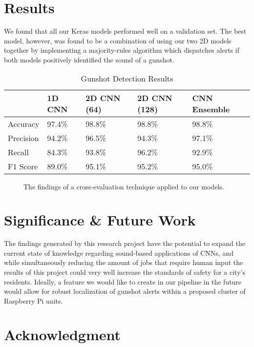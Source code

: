 \documentclass[conference]{IEEEtran}
\begin{document}
\section{Results}

We found that all our Keras models performed well on a validation set. The best model, however, was found to be a combination of using our two 2D models together by implementing a majority-rules algorithm which dispatches alerts if both models positively identified the sound of a gunshot.

\begin{table}[htbp]
\caption{Gunshot Detection Results}
\begin{tabular}{@{}lllll@{}}
\toprule
          & \textbf{1D CNN} & \textbf{2D CNN (64)} & \textbf{2D CNN (128)} & \textbf{CNN Ensemble} \\ \midrule
Accuracy  & 97.4\% & 98.8\%      & 98.8\%       & 98.8\%       \\
Precision & 94.2\% & 96.5\%      & 94.3\%       & 97.1\%       \\
Recall    & 84.3\% & 93.8\%      & 96.2\%       & 92.9\%       \\
F1 Score  & 89.0\% & 95.1\%      & 95.2\%       & 95.0\%       \\ \bottomrule
\end{tabular}
\label{tab2}
\end{table}

\begin{figure}[htbp]
\caption{The findings of a cross-evaluation technique applied to our models.}
\label{fig2}
\end{figure}

\section{Significance \& Future Work}

The findings generated by this research project have the potential to expand the current state of knowledge regarding sound-based applications of CNNs, and while simultaneously reducing the amount of jobs that require human input the results of this project could very well increase the standards of safety for a city’s residents. Ideally, a feature we would like to create in our pipeline in the future would allow for robust localization of gunshot alerts within a proposed cluster of Raspberry Pi units.

\section*{Acknowledgment}
\end{document}
